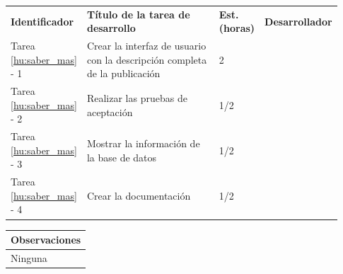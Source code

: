 \documentclass[11pt]{article}
\begin{document}
\vspace{-0.8cm}
\begin{longtable}{p{0.18\linewidth}|p{0.48\linewidth}|p{0.1\linewidth}|p{0.17\linewidth}}
  \toprule
  \textbf{Identificador} & \textbf{Título de la tarea de desarrollo} & \textbf{Est. (horas)} & \textbf{Desarrollador} \\
  Tarea \ref{hu:saber_mas} - 1 & Crear la interfaz de usuario con la descripción completa de la publicación & 2 &\\
  Tarea \ref{hu:saber_mas} - 2 & Realizar las pruebas de aceptación  & 1/2 & \\
  Tarea \ref{hu:saber_mas} - 3 & Mostrar la información de la base de datos & 1/2 & \\
  Tarea \ref{hu:saber_mas} - 4 & Crear la documentación & 1/2 &  \\
  \bottomrule
\end{longtable}
\vspace{-0.8cm}
\begin{longtable}{p{1.028\linewidth}}
  \textbf{Observaciones}\\
  \midrule
  Ninguna\\
  \bottomrule
\end{longtable}
\end{document}
